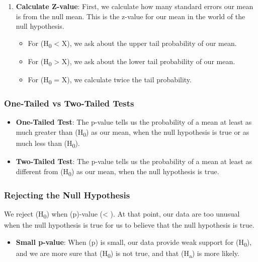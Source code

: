 \documentclass[
  letterpaper,
  DIV=11,
  numbers=noendperiod]{scrreprt}
\providecommand{\tightlist}{%
  \setlength{\itemsep}{0pt}\setlength{\parskip}{0pt}}\usepackage{longtable,booktabs,array}
\begin{document}
\begin{enumerate}
\def\labelenumi{\arabic{enumi}.}
\item
  \textbf{Calculate Z-value}: First, we calculate how many standard
  errors our mean is from the null mean. This is the z-value for our
  mean in the world of the null hypothesis.

  \begin{itemize}
  \tightlist
  \item
    For (H\textsubscript{0} \textless{} X), we ask about the upper tail
    probability of our mean.
  \item
    For (H\textsubscript{0} \textgreater{} X), we ask about the lower
    tail probability of our mean.
  \item
    For (H\textsubscript{0} = X), we calculate twice the tail
    probability.
  \end{itemize}
\end{enumerate}

\subsubsection{One-Tailed vs Two-Tailed
Tests}\label{one-tailed-vs-two-tailed-tests}

\begin{itemize}
\item
  \textbf{One-Tailed Test}: The p-value tells us the probability of a
  mean at least as much greater than (H\textsubscript{0}) as our mean,
  when the null hypothesis is true or as much less than
  (H\textsubscript{0}).
\item
  \textbf{Two-Tailed Test}: The p-value tells us the probability of a
  mean at least as different from (H\textsubscript{0}) as our mean, when
  the null hypothesis is true.
\end{itemize}

\subsubsection{Rejecting the Null
Hypothesis}\label{rejecting-the-null-hypothesis}

We reject (H\textsubscript{0}) when (p)-value (\textless{} \alpha). At
that point, our data are too unusual when the null hypothesis is true
for us to believe that the null hypothesis is true.

\begin{itemize}
\tightlist
\item
  \textbf{Small p-value}: When (p) is small, our data provide weak
  support for (H\textsubscript{0}), and we are more sure that
  (H\textsubscript{0}) is not true, and that (H\textsubscript{a}) is
  more likely.
\end{itemize}
\end{document}
